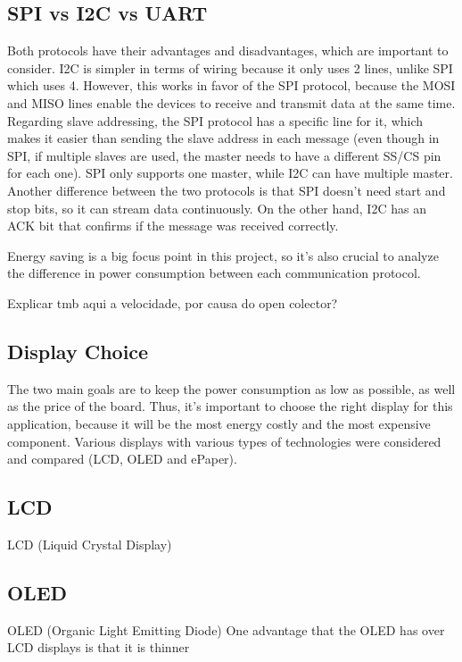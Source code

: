 \documentclass[english]{ist-thesis}
\begin{document}
\subsection{SPI vs I2C vs UART}

Both protocols have their advantages and disadvantages, which are important to consider. I2C is simpler in terms of wiring because it only uses 2 lines, unlike SPI which uses 4. However, this works in favor of the SPI protocol, because the MOSI and MISO lines enable the devices to receive and transmit data at the same time. 
Regarding slave addressing, the SPI protocol has a specific line for it, which makes it easier than sending the slave address in each message (even though in SPI, if multiple slaves are used, the master needs to have a different SS/CS pin for each one). SPI only supports one master, while I2C can have multiple master. 
Another difference between the two protocols is that SPI doesn't need start and stop bits, so it can stream data continuously. On the other hand, I2C has an ACK bit that confirms if the message was received correctly.



Energy saving is a big focus point in this project, so it's also crucial to analyze the difference in power consumption between each communication protocol.

Explicar tmb aqui a velocidade, por causa do open colector?

\subsection{Display Choice}

The two main goals are to keep the power consumption as low as possible, as well as the price of the board. Thus, it's important to choose the right display for this application, because it will be the most energy costly and the most expensive component. Various displays with various types of technologies were considered and compared (LCD, OLED and ePaper). 

\subsection{LCD}
LCD (Liquid Crystal Display) 

\subsection{OLED}
OLED (Organic Light Emitting Diode)
One advantage that the OLED has over LCD displays is that it is thinner
\end{document}
